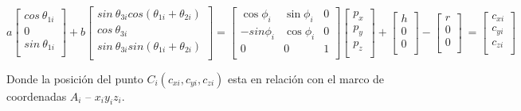     \begin{equation}
         a \left[ \begin{matrix}
        cos~ \theta _{1i}\\
        0\\
        sin~ \theta _{1i}\\
        \end{matrix}
         \right] +b \left[ \begin{matrix}
        sin~ \theta _{3i} cos⁡ \left(  \theta _{1i}+ \theta _{2i} \right) \\
        cos~ \theta _{3i}\\
        sin~ \theta _{3i}sin \left(  \theta _{1i}+ \theta _{2i} \right) \\
        \end{matrix}
         \right] = \left[ \begin{matrix}
        \cos  \phi _{i}  &  \sin  \phi _{i}  &  0\\
        -sin \phi _{i}  &  \cos  \phi _{i}  &  0\\
        0  &  0  &  1\\
        \end{matrix}
         \right]  \left[ \begin{matrix}
        p_{x}\\
        p_{y}\\
        p_{z}\\
        \end{matrix}
         \right] +  \left[ \begin{matrix}
        h\\
        0\\
        0\\
        \end{matrix}
         \right] - \left[ \begin{matrix}
        r\\
        0\\
        0\\
        \end{matrix}
         \right] ~= \left[ \begin{matrix}
        c_{xi}\\
        c_{yi}\\
        c_{zi}\\
        \end{matrix}
         \right] ~
        \label{eq:cap4_eq_22}
    \end{equation}    
    
    Donde la posición del punto $C_{i} (c_{xi},c_{yi},c_{zi})$ esta en relación con el marco de coordenadas $A_{i}$ – $x_{i} y_{i} z_{i}$.
    
